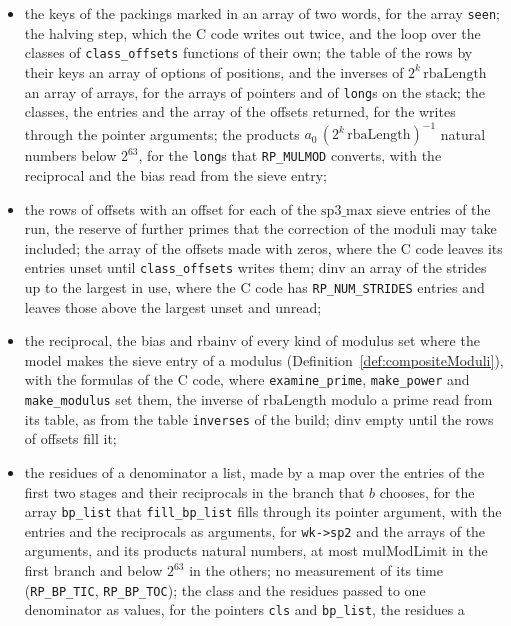\begin{itemize}
    \verb|long|s, with remainders and divisions for the masks and the shifts; no output under
    \verb|DEBUG|;
  \item the keys of the packings marked in an array of two words, for the array \verb|seen|; the
    halving step, which the C code writes out twice, and the loop over the classes of
    \verb|class_offsets| functions of their own; the table of the rows by their keys an array of
    options of positions, and the inverses of $2^k\,\mathrm{rbaLength}$ an array of arrays, for the
    arrays of pointers and of \verb|long|s on the stack; the classes, the entries and the array of
    the offsets returned, for the writes through the pointer arguments; the products
    $a_0\, (2^k\,\mathrm{rbaLength})^{-1}$ natural numbers below $2^{63}$, for the \verb|long|s that
    \verb|RP_MULMOD| converts, with the reciprocal and the bias read from the sieve entry;
  \item the rows of offsets with an offset for each of the $\mathrm{sp3\_max}$ sieve entries of the
    run, the reserve of further primes that the correction of the moduli may take included; the
    array of the offsets made with zeros, where the C code leaves its entries unset until
    \verb|class_offsets| writes them; $\mathrm{dinv}$ an array of the strides up to the largest in
    use, where the C code has \verb|RP_NUM_STRIDES| entries and leaves those above the largest unset
    and unread;
  \item the reciprocal, the bias and $\mathrm{rbainv}$ of every kind of modulus set where the model
    makes the sieve entry of a modulus (Definition~\ref{def:compositeModuli}), with the formulas of
    the C code, where \verb|examine_prime|, \verb|make_power| and \verb|make_modulus| set them, the
    inverse of $\mathrm{rbaLength}$ modulo a prime read from its table, as from the table
    \verb|inverses| of the build; $\mathrm{dinv}$ empty until the rows of offsets fill it;
  \item the residues of a denominator a list, made by a map over the entries of the first two stages
    and their reciprocals in the branch that $b$ chooses, for the array \verb|bp_list| that
    \verb|fill_bp_list| fills through its pointer argument, with the entries and the reciprocals as
    arguments, for \verb|wk->sp2| and the arrays of the arguments, and its products natural numbers,
    at most $\mathrm{mulModLimit}$ in the first branch and below $2^{63}$ in the others; no
    measurement of its time (\verb|RP_BP_TIC|, \verb|RP_BP_TOC|); the class and the residues passed
    to one denominator as values, for the pointers \verb|cls| and \verb|bp_list|, the residues a

\end{itemize}
